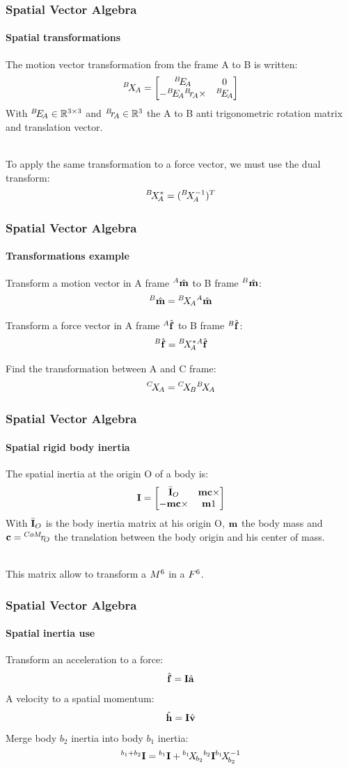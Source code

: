 \documentclass{beamer}
\begin{document}
\begin{frame}
\frametitle{Spatial Vector Algebra}
\framesubtitle{Spatial transformations}
The motion vector transformation from the frame A to B is written:
$$
\transform{A}{B} = \begin{bmatrix} \rotation{A}{B} & 0 \\ -\rotation{A}{B} \translation{A}{B} \times & \rotation{A}{B} \end{bmatrix}
$$
With $ \rotation{A}{B} \in \mathbb{R}^{3{\times}3} $ and $ \translation{A}{B} \in \mathbb{R}^{3} $ the A to B anti trigonometric rotation matrix and translation vector.

\hfill \\
To apply the same transformation to a force vector, we must use the dual transform:
$$
\transformDual{A}{B} = (\transformInv{A}{B})^T
$$
\end{frame}


\begin{frame}
\frametitle{Spatial Vector Algebra}
\framesubtitle{Transformations example}
Transform a motion vector in A frame $ \motionvecHatFrame{A} $ to B frame $ \motionvecHatFrame{B} $:
$$
\motionvecHatFrame{B} = \transform{A}{B} \motionvecHatFrame{A}
$$

Transform a force vector in A frame $ \forcevecHatFrame{A} $ to B frame $ \forcevecHatFrame{B} $:
$$
\forcevecHatFrame{B} = \transformDual{A}{B} \forcevecHatFrame{A}
$$

Find the transformation between A and C frame:
$$
\transform{A}{C} = \transform{B}{C}\transform{A}{B}
$$
\end{frame}


\begin{frame}
\frametitle{Spatial Vector Algebra}
\framesubtitle{Spatial rigid body inertia}
The spatial inertia at the origin O of a body is:
$$
\inertia = \begin{bmatrix} \inertiaBarOrigin{O} & \mass \bodycom \times \\ -\mass \bodycom \times & \mass1 \end{bmatrix}
$$
With $ \inertiaBarOrigin{O} $ is the body inertia matrix at his origin O, $ \mass $ the body mass and $ \bodycom = \translation{O}{{CoM}} $ the translation between the body origin and his center of mass.

\hfill \\
This matrix allow to transform a $ \motionspace{6} $ in a $ \forcespace{6} $.
\end{frame}


\begin{frame}
\frametitle{Spatial Vector Algebra}
\framesubtitle{Spatial inertia use}
Transform an acceleration to a force:
$$
\forcevecHat = \inertia \accelvecHat
$$
A velocity to a spatial momentum:
$$
\momentumHat = \inertia \velocityvecHat
$$
Merge body $ b_2 $ inertia into body $ b_1 $ inertia:
$$
{}^{b_1+b_2}\inertia = {}^{b_1}\inertia + \transform{{b_2}}{{b_1}} {}^{b_2}\inertia\transformInv{{b_2}}{{b_1}}
$$
\end{frame}
\end{document}
